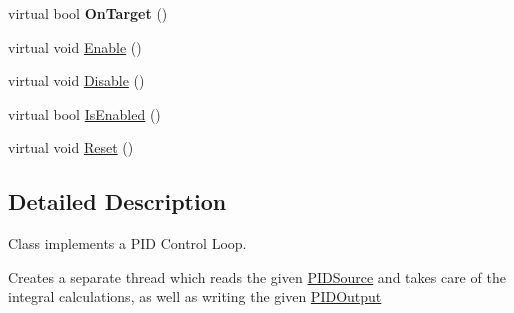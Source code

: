 \begin{DoxyCompactItemize}
\item 
\hypertarget{classPIDController_acee849c5dd29905362aaeb414de5c3ed}{
virtual bool {\bfseries OnTarget} ()}
\label{classPIDController_acee849c5dd29905362aaeb414de5c3ed}

\item 
virtual void \hyperlink{classPIDController_a1b272c08b669b2a86f47958aa839b656}{Enable} ()
\item 
virtual void \hyperlink{classPIDController_ad13d5e8f8b465a00ad2c21a14cb832c4}{Disable} ()
\item 
virtual bool \hyperlink{classPIDController_a55f228ba275cac683e82bbc48a298842}{IsEnabled} ()
\item 
virtual void \hyperlink{classPIDController_a7c4b30b19bbcf226f5c6de8df23ec9e9}{Reset} ()
\end{DoxyCompactItemize}


\subsection{Detailed Description}
Class implements a PID Control Loop.

Creates a separate thread which reads the given \hyperlink{classPIDSource}{PIDSource} and takes care of the integral calculations, as well as writing the given \hyperlink{classPIDOutput}{PIDOutput} 

